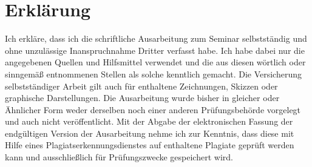 \documentclass[11pt]{article}
\begin{document}
\newpage

\section{Erklärung}
Ich erkläre, dass ich die schriftliche Ausarbeitung zum Seminar selbstständig und ohne unzulässige Inanspruchnahme Dritter verfasst habe. Ich habe dabei nur die angegebenen Quellen und Hilfsmittel verwendet und die aus diesen wörtlich oder sinngemäß entnommenen Stellen als solche kenntlich gemacht. Die Versicherung selbstständiger Arbeit gilt auch für enthaltene Zeichnungen, Skizzen oder graphische Darstellungen. Die Ausarbeitung wurde bisher in gleicher oder Ähnlicher Form weder derselben noch einer anderen Prüfungsbehörde vorgelegt und auch nicht veröffentlicht. Mit der Abgabe der elektronischen Fassung der endgültigen Version der Ausarbeitung nehme ich zur Kenntnis, dass diese mit Hilfe eines Plagiatserkennungsdienstes auf enthaltene Plagiate geprüft werden kann und ausschließlich für Prüfungszwecke gespeichert wird.
\end{document}

